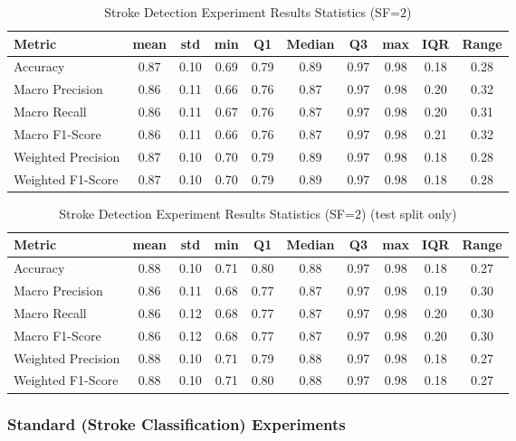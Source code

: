 \begin{table}[h]
\caption{Stroke Detection Experiment Results Statistics (SF=$2$)}
\label{tab:sf2_Stroke_Detection_Results_Statistics}
\begin{tabular}{|l|c|c|c|c|c|c|c|c|c|}
\toprule
Metric & mean & std & min & Q1 & Median & Q3 & max & IQR & Range \\
\midrule
Accuracy & 0.87 & 0.10 & 0.69 & 0.79 & 0.89 & 0.97 & 0.98 & 0.18 & 0.28 \\
Macro Precision & 0.86 & 0.11 & 0.66 & 0.76 & 0.87 & 0.97 & 0.98 & 0.20 & 0.32 \\
Macro Recall & 0.86 & 0.11 & 0.67 & 0.76 & 0.87 & 0.97 & 0.98 & 0.20 & 0.31 \\
Macro F1-Score & 0.86 & 0.11 & 0.66 & 0.76 & 0.87 & 0.97 & 0.98 & 0.21 & 0.32 \\
Weighted Precision & 0.87 & 0.10 & 0.70 & 0.79 & 0.89 & 0.97 & 0.98 & 0.18 & 0.28 \\
Weighted F1-Score & 0.87 & 0.10 & 0.70 & 0.79 & 0.89 & 0.97 & 0.98 & 0.18 & 0.28 \\
\bottomrule
\end{tabular}
\end{table}

\begin{table}[h]
\caption{Stroke Detection Experiment Results Statistics (SF=$2$) (test split only)}
\label{tab:sf2_test_Stroke_Detection_Results_Statistics}
\begin{tabular}{|l|c|c|c|c|c|c|c|c|c|}
\toprule
Metric & mean & std & min & Q1 & Median & Q3 & max & IQR & Range \\
\midrule
Accuracy & 0.88 & 0.10 & 0.71 & 0.80 & 0.88 & 0.97 & 0.98 & 0.18 & 0.27 \\
Macro Precision & 0.86 & 0.11 & 0.68 & 0.77 & 0.87 & 0.97 & 0.98 & 0.19 & 0.30 \\
Macro Recall & 0.86 & 0.12 & 0.68 & 0.77 & 0.87 & 0.97 & 0.98 & 0.20 & 0.30 \\
Macro F1-Score & 0.86 & 0.12 & 0.68 & 0.77 & 0.87 & 0.97 & 0.98 & 0.20 & 0.30 \\
Weighted Precision & 0.88 & 0.10 & 0.71 & 0.79 & 0.88 & 0.97 & 0.98 & 0.18 & 0.27 \\
Weighted F1-Score & 0.88 & 0.10 & 0.71 & 0.80 & 0.88 & 0.97 & 0.98 & 0.18 & 0.27 \\
\bottomrule
\end{tabular}
\end{table}


\clearpage\subsubsection{Standard (Stroke Classification) Experiments}

